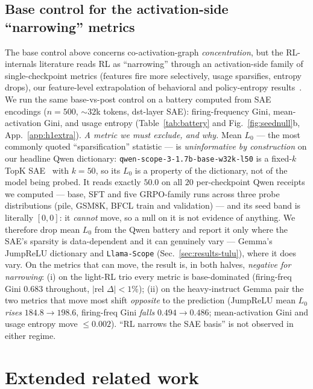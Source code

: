 \documentclass{article}
\begin{document}
\subsection{Base control for the activation-side ``narrowing'' metrics}
The base control above concerns co-activation-graph \emph{concentration}, but the RL-internals literature reads RL as ``narrowing'' through an activation-side family of single-checkpoint metrics (features fire more selectively, usage sparsifies, entropy drops), our feature-level extrapolation of behavioral and policy-entropy results~\citep{yue2025,wang2025,cui2025entropy_mechanism}. We run the same base-vs-post control on a battery computed from SAE encodings ($n{=}500$, ${\sim}32$k tokens, dst-layer SAE): firing-frequency Gini, mean-activation Gini, and usage entropy (Table~\ref{tab:battery} and Fig.~\ref{fig:seednull}b, App.~\ref{app:h1extra}). \emph{A metric we must exclude, and why.} Mean $L_0$ --- the most commonly quoted ``sparsification'' statistic --- is \emph{uninformative by construction} on our headline Qwen dictionary: \texttt{qwen-scope-3-1.7b-base-w32k-l50} is a fixed-$k$ TopK SAE~\citep{gao2024scaling} with $k{=}50$, so its $L_0$ is a property of the dictionary, not of the model being probed. It reads exactly $50.0$ on all $20$ per-checkpoint Qwen receipts we computed --- base, SFT and five GRPO-family runs across three probe distributions (pile, GSM8K, BFCL train and validation) --- and its seed band is literally $[0,0]$: it \emph{cannot} move, so a null on it is not evidence of anything. We therefore drop mean $L_0$ from the Qwen battery and report it only where the SAE's sparsity is data-dependent and it can genuinely vary --- Gemma's JumpReLU dictionary and \texttt{Llama-Scope} (Sec.~\ref{sec:results-tulu}), where it does vary. On the metrics that can move, the result is, in both halves, \emph{negative for narrowing}: (i) on the light-RL trio every metric is base-dominated (firing-freq Gini $0.683$ throughout, $|\text{rel }\Delta|<1\%$); (ii) on the heavy-instruct Gemma pair the two metrics that move most shift \emph{opposite} to the prediction (JumpReLU mean $L_0$ \emph{rises} $184.8\to198.6$, firing-freq Gini \emph{falls} $0.494\to0.486$; mean-activation Gini and usage entropy move $\le0.002$). ``RL narrows the SAE basis'' is not observed in either regime.

\section{Extended related work}
\label{app:related}
\end{document}
